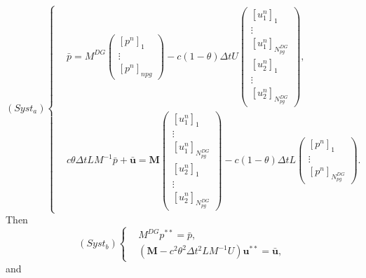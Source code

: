 \documentclass[a4paper, 11pt]{report}
\begin{document}
\begin{equation*}
(Syst_a)\left\{
\begin{split}
&\bar{p}=M^{DG}\begin{pmatrix}\left[p^n\right]_1\\ \vdots\\ \left[p^n\right]_{npg}\end{pmatrix}-c(1-\theta)\Delta tU\begin{pmatrix}[u^n_1]_1\\ \vdots\\ [u^n_1]_{N_{pg}^{DG}}\\ [u^n_2]_1\\ \vdots\\ [u^n_2]_{N_{pg}^{DG}}\end{pmatrix},\\
&c\theta\Delta tLM^{-1}\bar{p}+\bar{\boldsymbol{u}}=\boldsymbol{M}\begin{pmatrix}\left[u_1^n\right]_1\\ \vdots\\ \left[u_1^n\right]_{N_{pg}^{DG}}\\\left[u_2^n\right]_1\\ \vdots\\ \left[u_2^n\right]_{N_{pg}^{DG}}\end{pmatrix}-c(1-\theta)\Delta tL\begin{pmatrix}[p^n]_1\\ \vdots\\ [p^{n}]_{N_{pg}^{DG}}\end{pmatrix}.
\end{split}
\right.
\end{equation*}
Then
\begin{equation*}
(Syst_b)\left\{
\begin{split}
&M^{DG}p^{**}=\bar{p},\\
&\left(\boldsymbol{M}-c^2\theta^2\Delta t^2LM^{-1}U\right)\boldsymbol{u}^{**}=\bar{\boldsymbol{u}},
\end{split}
\right.
\end{equation*}
and
\end{document}
